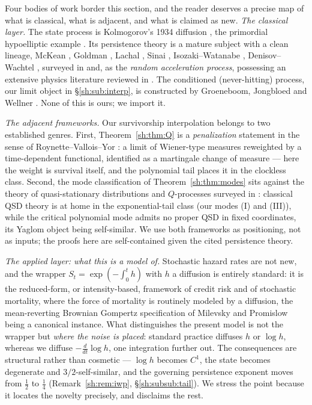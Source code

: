 \documentclass[11pt]{article}
\numberwithin{equation}{section}
\theoremstyle{plain}
\theoremstyle{definition}
\theoremstyle{remark}
\begin{document}
Four bodies of work border this section, and the reader deserves a
precise map of what is classical, what is adjacent, and what is claimed
as new. \emph{The classical layer.} The state process is Kolmogorov's 1934
diffusion \cite{Kol34}, the primordial hypoelliptic example
\cite{Hor67}. Its persistence theory is a mature subject with a clean
lineage, McKean \cite{McK63}, Goldman \cite{Gol71}, Lachal
\cite{Lac91}, Sinai \cite{Sin92}, Isozaki--Watanabe \cite{IW94},
Denisov--Wachtel \cite{DW15}, surveyed in \cite{AS15} and, as the
\emph{random acceleration process}, possessing an extensive physics
literature reviewed in \cite{BMS13}. The conditioned (never-hitting)
process, our limit object in \S\ref{sh:sub:interp}, is constructed by
Groeneboom, Jongbloed and Wellner \cite{GJW99}. None of this is ours;
we import it.

\emph{The adjacent frameworks.} Our survivorship interpolation belongs
to two established genres. First, Theorem~\ref{sh:thm:Q} is a
\emph{penalization} statement in the sense of Roynette--Vallois--Yor
\cite{RVY06}: a limit of Wiener-type measures reweighted by a
time-dependent functional, identified as a martingale change of measure
--- here the weight is survival itself, and the polynomial tail places
it in the clockless class. Second, the mode classification of
Theorem~\ref{sh:thm:modes} sits against the theory of quasi-stationary
distributions and $Q$-processes surveyed in \cite{MV12}: classical QSD
theory is at home in the exponential-tail class (our modes (I) and
(III)), while the critical polynomial mode admits no proper QSD in fixed
coordinates, its Yaglom object being self-similar. We use both
frameworks as positioning, not as inputs; the proofs here are
self-contained given the cited persistence theory.

\emph{The applied layer: what this is a model of.} Stochastic hazard
rates are not new, and the wrapper $S_t=\exp(-\int_0^th)$ with $h$ a
diffusion is entirely standard: it is the reduced-form, or
intensity-based, framework of credit risk \cite{Lan04} and of stochastic
mortality, where the force of mortality is routinely modeled by a
diffusion, the mean-reverting Brownian Gompertz specification of Milevsky
and Promislow \cite{MP01} being a canonical instance. What distinguishes
the present model is not the wrapper but \emph{where the noise is
placed}: standard practice diffuses $h$ or $\log h$, whereas we diffuse
$-\tfrac{d}{dt}\log h$, one integration further out. The consequences are
structural rather than cosmetic --- $\log h$ becomes $C^1$, the state
becomes degenerate and $3/2$-self-similar, and the governing persistence
exponent moves from $\tfrac12$ to $\tfrac14$ (Remark~\ref{sh:rem:iwp},
\S\ref{sh:subsub:tail}). We stress the point because it locates the
novelty precisely, and disclaims the rest.
\end{document}
